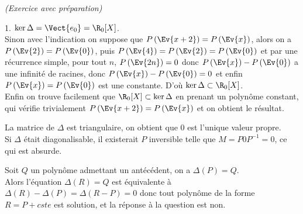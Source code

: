 \documentclass[11pt]{article}%
\begin{document}
\begin{exercice}{\it (Exercice avec préparation)}
\begin{noliste}{1.}
$\ker \Delta = \Vect{ e_{0}} = \R_{0} [X]$. \\
 Sinon avec l'indication on suppose que $P\left(\Ev{x + 2}\right) =
P\left(\Ev{x}\right)$, alors on a $P\left(\Ev{2}\right) =
P\left(\Ev{0}\right)$, puis $P\left(\Ev{4}\right) =
P\left(\Ev{2}\right) = P\left(\Ev{0}\right)$ et par une récurrence
simple, pour tout $n$, $P\left(\Ev{2n}\right) = 0$ donc
$P\left(\Ev{x}\right) - P\left(\Ev{0}\right)$ a une infinité de
racines, donc $P\left(\Ev{x}\right) - P\left(\Ev{0}\right) = 0$ et
enfin $P\left(\Ev{x}\right) = P\left(\Ev{0}\right)$ est une constante.
D'où $\ker \Delta \subset \R_{0} [X]$. \\
 Enfin on trouve facilement que $\R_{0}[X] \subset \ker \Delta$ en
prenant un polynôme constant, qui vérifie trivialement $P\left(\Ev{x +
2}\right) = P\left(\Ev{x}\right)$ et on obtient le résultat. \\
 \item La matrice de $\Delta$ est triangulaire, on obtient que 0 est
l'unique valeur propre. \\
 Si $\Delta$ était diagonalisable, il existerait $P$ inversible telle
que $M = P 0 P^{-1} = 0$, ce qui est absurde. \\
 \item Soit $Q$ un polynôme admettant un antécédent, on a $\Delta (P) =
Q$. \\
 Alors l'équation $\Delta (R) = Q$ est équivalente à $\Delta (R) -
\Delta (P) = \Delta (R - P) = 0$ donc tout polynôme de la forme $R = P
+ cste$ est solution, et la réponse à la question est non.

 \end{noliste}
 \end{exercice}

 \newpage
\end{document}
